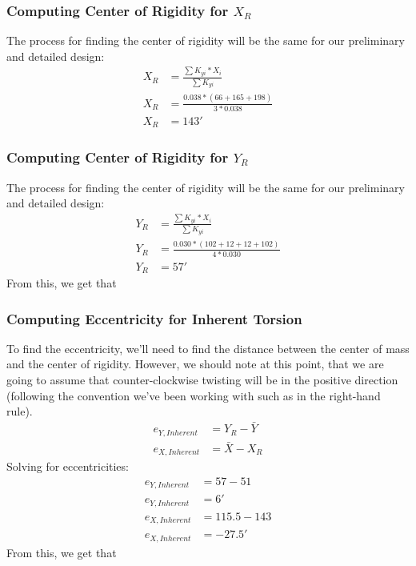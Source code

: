 \documentclass{report} %
\begin{document}
\subsubsection*{Computing Center of Rigidity for $X_R$}
The process for finding the center of rigidity will be the same for our preliminary and detailed design:
\begin{equation*}
    \begin{aligned}
        X_R &= \frac{\sum{K_{yi}*X_i}}{\sum{K_{yi}}} \\
        X_R &= \frac{0.038*(66+165+198)}{3*0.038} \\
        X_R &= 143'
    \end{aligned}
\end{equation*}

\subsubsection*{Computing Center of Rigidity for $Y_R$}
The process for finding the center of rigidity will be the same for our preliminary and detailed design:
\begin{equation*}
    \begin{aligned}
        Y_R &= \frac{\sum{K_{yi}*X_i}}{\sum{K_{yi}}} \\
        Y_R &= \frac{0.030*(102+12+12+102)}{4*0.030} \\
        Y_R &= 57'
    \end{aligned}
\end{equation*}
From this, we get that  \\

\subsubsection*{Computing Eccentricity for Inherent Torsion}
To find the eccentricity, we'll need to find the distance between the center of mass and the center of rigidity. However, we should note at this point, that we are going to assume that counter-clockwise twisting will be in the positive direction (following the convention we've been working with such as in the right-hand rule).
\begin{equation*}
    \begin{aligned}
        e_{Y,Inherent} &= Y_R - \bar{Y} \\
        e_{X,Inherent} &= \bar{X} - X_R 
    \end{aligned}
\end{equation*}
Solving for eccentricities:
\begin{equation*}
    \begin{aligned}
        e_{Y,Inherent} &= 57 - 51 \\
        e_{Y,Inherent} &= 6' \\
        e_{X,Inherent} &= 115.5 - 143 \\
        e_{X,Inherent} &= -27.5'
    \end{aligned}
\end{equation*}
From this, we get that  \\
\end{document}
